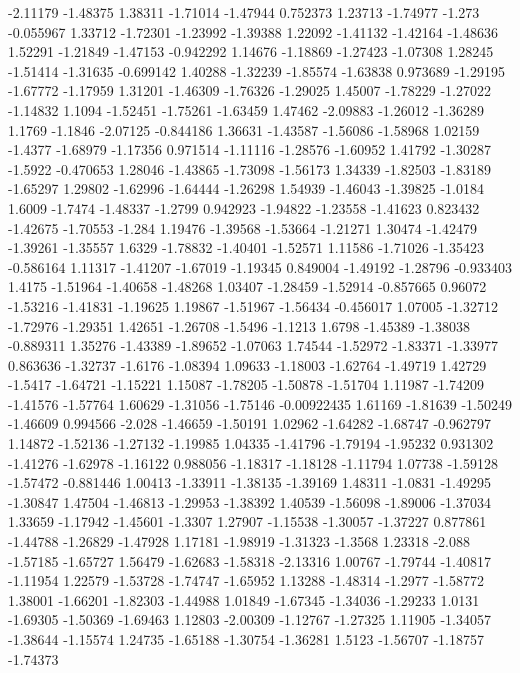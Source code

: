 \documentclass[9pt]{article}
\theoremstyle{plain}
\theoremstyle{definition}
\theoremstyle{remark}
\numberwithin{equation}{section}
\begin{document}
-2.11179
-1.48375
1.38311
-1.71014
-1.47944
0.752373
1.23713
-1.74977
-1.273
-0.055967
1.33712
-1.72301
-1.23992
-1.39388
1.22092
-1.41132
-1.42164
-1.48636
1.52291
-1.21849
-1.47153
-0.942292
1.14676
-1.18869
-1.27423
-1.07308
1.28245
-1.51414
-1.31635
-0.699142
1.40288
-1.32239
-1.85574
-1.63838
0.973689
-1.29195
-1.67772
-1.17959
1.31201
-1.46309
-1.76326
-1.29025
1.45007
-1.78229
-1.27022
-1.14832
1.1094
-1.52451
-1.75261
-1.63459
1.47462
-2.09883
-1.26012
-1.36289
1.1769
-1.1846
-2.07125
-0.844186
1.36631
-1.43587
-1.56086
-1.58968
1.02159
-1.4377
-1.68979
-1.17356
0.971514
-1.11116
-1.28576
-1.60952
1.41792
-1.30287
-1.5922
-0.470653
1.28046
-1.43865
-1.73098
-1.56173
1.34339
-1.82503
-1.83189
-1.65297
1.29802
-1.62996
-1.64444
-1.26298
1.54939
-1.46043
-1.39825
-1.0184
1.6009
-1.7474
-1.48337
-1.2799
0.942923
-1.94822
-1.23558
-1.41623
0.823432
-1.42675
-1.70553
-1.284
1.19476
-1.39568
-1.53664
-1.21271
1.30474
-1.42479
-1.39261
-1.35557
1.6329
-1.78832
-1.40401
-1.52571
1.11586
-1.71026
-1.35423
-0.586164
1.11317
-1.41207
-1.67019
-1.19345
0.849004
-1.49192
-1.28796
-0.933403
1.4175
-1.51964
-1.40658
-1.48268
1.03407
-1.28459
-1.52914
-0.857665
0.96072
-1.53216
-1.41831
-1.19625
1.19867
-1.51967
-1.56434
-0.456017
1.07005
-1.32712
-1.72976
-1.29351
1.42651
-1.26708
-1.5496
-1.1213
1.6798
-1.45389
-1.38038
-0.889311
1.35276
-1.43389
-1.89652
-1.07063
1.74544
-1.52972
-1.83371
-1.33977
0.863636
-1.32737
-1.6176
-1.08394
1.09633
-1.18003
-1.62764
-1.49719
1.42729
-1.5417
-1.64721
-1.15221
1.15087
-1.78205
-1.50878
-1.51704
1.11987
-1.74209
-1.41576
-1.57764
1.60629
-1.31056
-1.75146
-0.00922435
1.61169
-1.81639
-1.50249
-1.46609
0.994566
-2.028
-1.46659
-1.50191
1.02962
-1.64282
-1.68747
-0.962797
1.14872
-1.52136
-1.27132
-1.19985
1.04335
-1.41796
-1.79194
-1.95232
0.931302
-1.41276
-1.62978
-1.16122
0.988056
-1.18317
-1.18128
-1.11794
1.07738
-1.59128
-1.57472
-0.881446
1.00413
-1.33911
-1.38135
-1.39169
1.48311
-1.0831
-1.49295
-1.30847
1.47504
-1.46813
-1.29953
-1.38392
1.40539
-1.56098
-1.89006
-1.37034
1.33659
-1.17942
-1.45601
-1.3307
1.27907
-1.15538
-1.30057
-1.37227
0.877861
-1.44788
-1.26829
-1.47928
1.17181
-1.98919
-1.31323
-1.3568
1.23318
-2.088
-1.57185
-1.65727
1.56479
-1.62683
-1.58318
-2.13316
1.00767
-1.79744
-1.40817
-1.11954
1.22579
-1.53728
-1.74747
-1.65952
1.13288
-1.48314
-1.2977
-1.58772
1.38001
-1.66201
-1.82303
-1.44988
1.01849
-1.67345
-1.34036
-1.29233
1.0131
-1.69305
-1.50369
-1.69463
1.12803
-2.00309
-1.12767
-1.27325
1.11905
-1.34057
-1.38644
-1.15574
1.24735
-1.65188
-1.30754
-1.36281
1.5123
-1.56707
-1.18757
-1.74373
\end{document}
